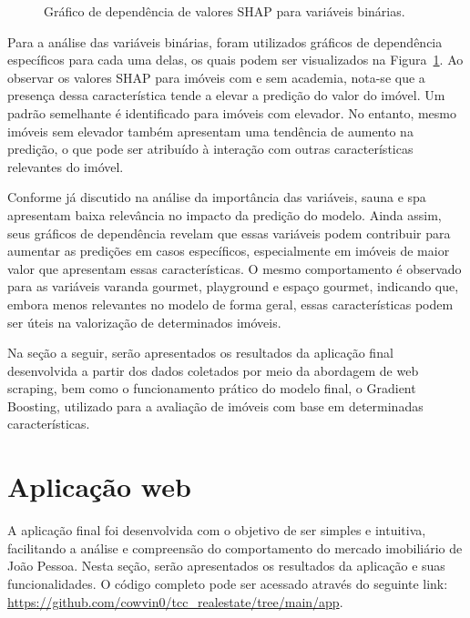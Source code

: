 \documentclass[
  12pt,
  a4paper,
]{scrreprt}
\begin{document}
\begin{figure}
\caption{\label{fig-dependence_plot}Gráfico de dependência de valores
SHAP para variáveis binárias.}

\end{figure}%

\vspace{12pt}

Para a análise das variáveis binárias, foram utilizados gráficos de
dependência específicos para cada uma delas, os quais podem ser
visualizados na Figura~\ref{fig-dependence_plot}. Ao observar os valores
SHAP para imóveis com e sem academia, nota-se que a presença dessa
característica tende a elevar a predição do valor do imóvel. Um padrão
semelhante é identificado para imóveis com elevador. No entanto, mesmo
imóveis sem elevador também apresentam uma tendência de aumento na
predição, o que pode ser atribuído à interação com outras
características relevantes do imóvel.

\vspace{12pt}

Conforme já discutido na análise da importância das variáveis, sauna e
spa apresentam baixa relevância no impacto da predição do modelo. Ainda
assim, seus gráficos de dependência revelam que essas variáveis podem
contribuir para aumentar as predições em casos específicos,
especialmente em imóveis de maior valor que apresentam essas
características. O mesmo comportamento é observado para as variáveis
varanda gourmet, playground e espaço gourmet, indicando que, embora
menos relevantes no modelo de forma geral, essas características podem
ser úteis na valorização de determinados imóveis.

\vspace{12pt}

Na seção a seguir, serão apresentados os resultados da aplicação final
desenvolvida a partir dos dados coletados por meio da abordagem de web
scraping, bem como o funcionamento prático do modelo final, o Gradient
Boosting, utilizado para a avaliação de imóveis com base em determinadas
características.

\section{Aplicação web}\label{aplicauxe7uxe3o-web}

A aplicação final foi desenvolvida com o objetivo de ser simples e
intuitiva, facilitando a análise e compreensão do comportamento do
mercado imobiliário de João Pessoa. Nesta seção, serão apresentados os
resultados da aplicação e suas funcionalidades. O código completo pode
ser acessado através do seguinte link:
\url{https://github.com/cowvin0/tcc_realestate/tree/main/app}.
\end{document}
